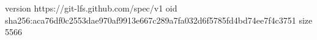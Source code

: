 version https://git-lfs.github.com/spec/v1
oid sha256:aca76df0c2553dae970af9913e667c289a7fa032d6f5785fd4bd74ee7f4c3751
size 5566
